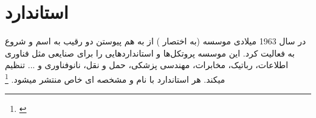 
\section{استاندارد }

در سال 1963 میلادی موسسه  (به اختصار ) از به هم پیوستن دو رقیب به اسم
 و  شروع به فعالیت کرد.
این موسسه پروتکل‌ها و استانداردهایی را برای صنایعی مثل فناوری اطلاعات، رباتیک، مخابرات، مهندسی پزشکی، حمل و نقل، نانوفناوری و ... تنظیم میکند.
هر استاندارد با نام و مشخصه ای خاص منتشر میشود.
\footnote{\href{http://mimtech.ir/mag/ieee-standards/}{}}
